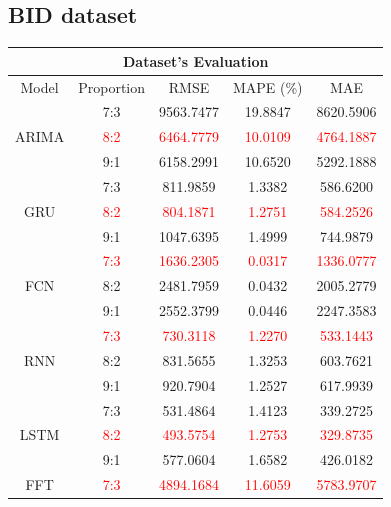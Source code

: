 \documentclass{ieeeojies}
\begin{document}
\subsection{BID dataset} 
\begin{table}[H]
    \centering
    \begin{tabular}{|c|c|c|c|c|}
         \hline
         \multicolumn{5}{|c|}{\textbf{Dataset's Evaluation}}\\
         \hline
         \centering Model & Proportion & RMSE & MAPE (\%) & MAE\\
         \hline
         \multirow{3}{*}{ARIMA} 
         & 7:3 & 9563.7477 & 19.8847 & 8620.5906 \\ 
         & \textcolor{red}{8:2}  & \textcolor{red}{6464.7779} & \textcolor{red}{10.0109} & \textcolor{red}{4764.1887} \\ 
         & 9:1 & 6158.2991 & 10.6520 & 5292.1888 \\
         \hline
         \multirow{3}{*}{GRU} 
         & 7:3 & 811.9859 & 1.3382 & 586.6200 \\ 
         & \textcolor{red}{8:2}  & \textcolor{red}{804.1871} & \textcolor{red}{1.2751} & \textcolor{red}{584.2526} \\
         & 9:1 & 1047.6395 & 1.4999 & 744.9879 \\
         \hline
         \multirow{3}{*}{FCN} 
         & \textcolor{red}{7:3}  & \textcolor{red}{1636.2305} & \textcolor{red}{0.0317} & \textcolor{red}{1336.0777} \\ 
         & 8:2 & 2481.7959 & 0.0432 & 2005.2779 \\ 
         & 9:1 & 2552.3799 & 0.0446 & 2247.3583 \\
         \hline
         \multirow{3}{*}{RNN} 
         & \textcolor{red}{7:3}  & \textcolor{red}{730.3118} & \textcolor{red}{1.2270} & \textcolor{red}{533.1443} \\ 
         & 8:2 & 831.5655 & 1.3253 & 603.7621 \\ 
         & 9:1 & 920.7904 & 1.2527 & 617.9939 \\
         \hline
         \multirow{3}{*}{LSTM} 
         & 7:3 & 531.4864 & 1.4123 & 339.2725 \\ 
         & \textcolor{red}{8:2}  & \textcolor{red}{493.5754} & \textcolor{red}{1.2753} & \textcolor{red}{329.8735} \\ 
         & 9:1 & 577.0604 & 1.6582 & 426.0182 \\
         \hline
         \multirow{3}{*}{FFT} 
         & \textcolor{red}{7:3}  & \textcolor{red}{4894.1684} & \textcolor{red}{11.6059} & \textcolor{red}{5783.9707} \\

\end{tabular}
\end{table}
\end{document}
